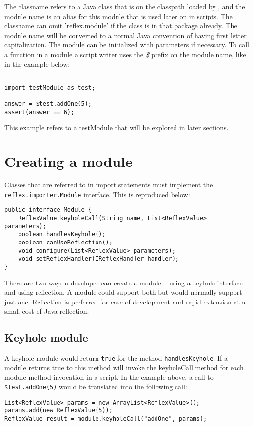 The classname refers to a Java class that is on the classpath loaded by \Reflex, and the module name is an alias for this module that is used later on in scripts. The classname can omit 'reflex.module' if the class is in that package already. The module name will be converted to a normal Java convention of having first letter capitalization. The module can be initialized with parameters if necessary. To call a function in a module a script writer uses the \emph{\$} prefix on the module name, like in the example below:

\begin{lstlisting}[caption={Module example}]

import testModule as test;

answer = $test.addOne(5);
assert(answer == 6);
\end{lstlisting}

This example refers to a testModule that will be explored in later sections.

\section{Creating a module}
Classes that are referred to in import statements must implement the \Verb+reflex.importer.Module+ interface. This is reproduced below:
\begin{lstlisting}[caption={Module interface}]
public interface Module {
    ReflexValue keyholeCall(String name, List<ReflexValue> parameters);
    boolean handlesKeyhole();
    boolean canUseReflection();
    void configure(List<ReflexValue> parameters);
    void setReflexHandler(IReflexHandler handler);
}
\end{lstlisting}
There are two ways a developer can create a module -- using a keyhole interface and using reflection. A module could support both but would normally support just one. Reflection is preferred for ease of development and rapid extension at a small cost of Java reflection.
\subsection{Keyhole module}
A keyhole module would return \Verb+true+ for the method \verb+handlesKeyhole+. If a module returns true to this method \Reflex will invoke the keyholeCall method for each module method invocation in a \Reflex script. In the example above, a call to \verb+$test.addOne(5)+ would be translated into the following call:

\begin{Verbatim}
List<ReflexValue> params = new ArrayList<ReflexValue>();
params.add(new ReflexValue(5));
ReflexValue result = module.keyholeCall("addOne", params);
\end{Verbatim}

